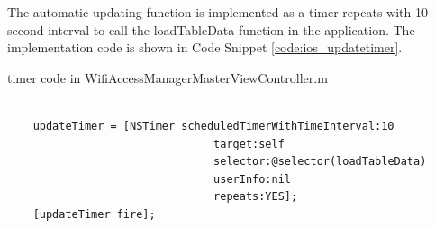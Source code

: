 \par The automatic updating function is implemented as a timer repeats with 10 second interval to call the loadTableData function in the application. The implementation code is shown in Code Snippet \ref{code:ios_updatetimer}.

\begin{algorithm}[h]
  \caption{timer code in WifiAccessManagerMasterViewController.m}
  \label{code:ios_updatetimer}
  \begin{verbatim}
  
    updateTimer = [NSTimer scheduledTimerWithTimeInterval:10 
    							target:self 
    							selector:@selector(loadTableData) 
    							userInfo:nil 
    							repeats:YES];
    [updateTimer fire];
 \end{verbatim}
\end{algorithm}

